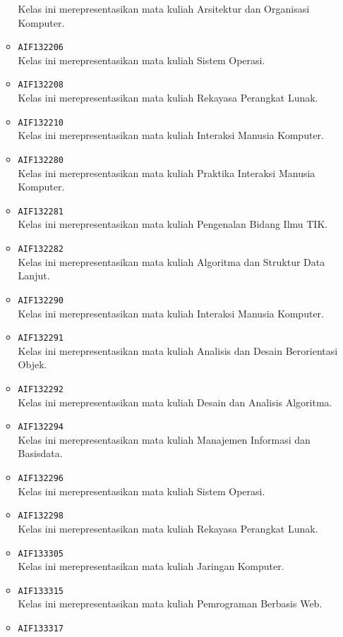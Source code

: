 \begin{enumerate}
\begin{itemize}
Kelas ini merepresentasikan mata kuliah Arsitektur dan Organisasi Komputer.
\item \texttt{AIF132206} \\
Kelas ini merepresentasikan mata kuliah Sistem Operasi.
\item \texttt{AIF132208} \\
Kelas ini merepresentasikan mata kuliah Rekayasa Perangkat Lunak.
\item \texttt{AIF132210} \\
Kelas ini merepresentasikan mata kuliah Interaksi Manusia Komputer.
\item \texttt{AIF132280} \\
Kelas ini merepresentasikan mata kuliah Praktika Interaksi Manusia Komputer.
\item \texttt{AIF132281} \\
Kelas ini merepresentasikan mata kuliah Pengenalan Bidang Ilmu TIK.
\item \texttt{AIF132282} \\
Kelas ini merepresentasikan mata kuliah Algoritma dan Struktur Data Lanjut.
\item \texttt{AIF132290} \\
Kelas ini merepresentasikan mata kuliah Interaksi Manusia Komputer.
\item \texttt{AIF132291} \\
Kelas ini merepresentasikan mata kuliah Analisis dan Desain Berorientasi Objek.
\item \texttt{AIF132292} \\
Kelas ini merepresentasikan mata kuliah Desain dan Analisis Algoritma.
\item \texttt{AIF132294} \\
Kelas ini merepresentasikan mata kuliah Manajemen Informasi dan Basisdata.
\item \texttt{AIF132296} \\
Kelas ini merepresentasikan mata kuliah Sistem Operasi.
\item \texttt{AIF132298} \\
Kelas ini merepresentasikan mata kuliah Rekayasa Perangkat Lunak.
\item \texttt{AIF133305} \\
Kelas ini merepresentasikan mata kuliah Jaringan Komputer.
\item \texttt{AIF133315} \\
Kelas ini merepresentasikan mata kuliah Pemrograman Berbasis Web.
\item \texttt{AIF133317} \\

\end{itemize}
\end{enumerate}
